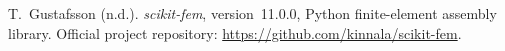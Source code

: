 T.~Gustafsson (n.d.).
\emph{scikit-fem}, version~11.0.0, Python finite-element assembly library.
Official project repository:
\url{https://github.com/kinnala/scikit-fem}.
